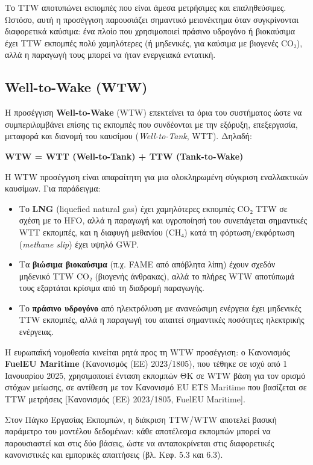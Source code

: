 Το TTW αποτυπώνει εκπομπές που είναι άμεσα μετρήσιμες και επαληθεύσιμες.
Ωστόσο, αυτή η προσέγγιση παρουσιάζει σημαντικό μειονέκτημα όταν
συγκρίνονται διαφορετικά καύσιμα: ένα πλοίο που χρησιμοποιεί πράσινο
υδρογόνο ή βιοκαύσιμα έχει TTW εκπομπές πολύ χαμηλότερες (ή μηδενικές,
για καύσιμα με βιογενές CO₂), αλλά η παραγωγή τους μπορεί να ήταν
ενεργειακά εντατική.

\subsection{Well-to-Wake (WTW)}\label{well-to-wake-wtw}

Η προσέγγιση \textbf{Well-to-Wake} (WTW) επεκτείνει τα όρια του
συστήματος ώστε να συμπεριλαμβάνει επίσης τις εκπομπές που συνδέονται με
την εξόρυξη, επεξεργασία, μεταφορά και διανομή του καυσίμου
(\emph{Well-to-Tank}, WTT). Δηλαδή:

\textbf{WTW = WTT (Well-to-Tank) + TTW (Tank-to-Wake)}

Η WTW προσέγγιση είναι απαραίτητη για μια ολοκληρωμένη σύγκριση
εναλλακτικών καυσίμων. Για παράδειγμα:

\begin{itemize}
\tightlist
\item
  Το \textbf{LNG} (liquefied natural gas) έχει χαμηλότερες εκπομπές CO₂
  TTW σε σχέση με το HFO, αλλά η παραγωγή και υγροποίησή του συνεπάγεται
  σημαντικές WTT εκπομπές, και η διαφυγή μεθανίου (CH₄) κατά τη
  φόρτωση/εκφόρτωση (\emph{methane slip}) έχει υψηλό GWP.
\item
  Τα \textbf{βιώσιμα βιοκαύσιμα} (π.χ. FAME από απόβλητα λίπη) έχουν
  σχεδόν μηδενικό TTW CO₂ (βιογενής άνθρακας), αλλά το πλήρες WTW
  αποτύπωμά τους εξαρτάται κρίσιμα από τη διαδρομή παραγωγής.
\item
  Το \textbf{πράσινο υδρογόνο} από ηλεκτρόλυση με ανανεώσιμη ενέργεια
  έχει μηδενικές TTW εκπομπές, αλλά η παραγωγή του απαιτεί σημαντικές
  ποσότητες ηλεκτρικής ενέργειας.
\end{itemize}

Η ευρωπαϊκή νομοθεσία κινείται ρητά προς τη WTW προσέγγιση: ο Κανονισμός
\textbf{FuelEU Maritime} (Κανονισμός (ΕΕ) 2023/1805), που τέθηκε σε ισχύ
από 1 Ιανουαρίου 2025, χρησιμοποιεί ένταση εκπομπών ΘΚ σε WTW βάση για
τον ορισμό στόχων μείωσης, σε αντίθεση με τον Κανονισμό EU ETS Maritime
που βασίζεται σε TTW μετρήσεις {[}Κανονισμός (ΕΕ) 2023/1805, FuelEU
Maritime{]}.

Στον Πάγκο Εργασίας Εκπομπών, η διάκριση TTW/WTW αποτελεί βασική
παράμετρο του μοντέλου δεδομένων: κάθε αποτέλεσμα εκπομπών μπορεί να
παρουσιαστεί και στις δύο βάσεις, ώστε να ανταποκρίνεται στις
διαφορετικές κανονιστικές και εμπορικές απαιτήσεις (βλ. Κεφ. 5.3 και
6.3).

